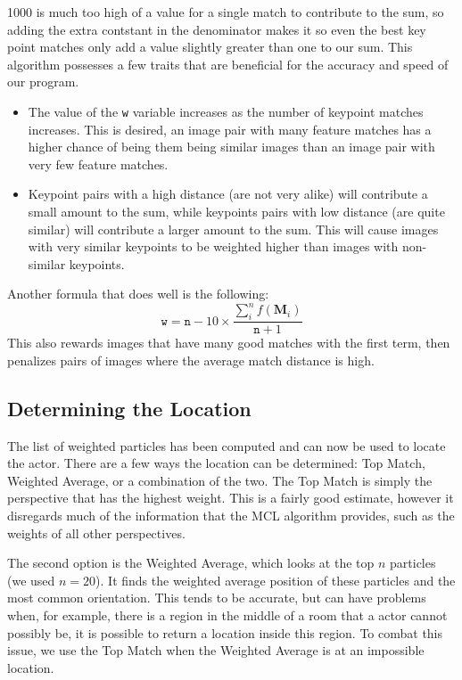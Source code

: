 \documentclass[a4paper,11pt]{article}
\begin{document}
1000 is much too high of a value for a single match to contribute to the sum, so adding the extra contstant in the denominator makes it so even the best key point matches only add a value slightly greater than one to our sum. This algorithm possesses a few traits that are beneficial for the accuracy and speed of our program.
\begin{itemize}
  \item The value of the \texttt{w} variable increases as the number of keypoint matches increases. This is desired, an image pair with many feature matches has a higher chance of being them being similar images than an image pair with very few  feature matches.
  \item Keypoint pairs with a high distance (are not very alike) will contribute a small amount to the sum, while keypoints pairs with low distance (are quite similar) will contribute a larger amount to the sum. This will cause images with very similar keypoints to be weighted higher than images with non-similar keypoints.
\end{itemize}

Another formula that does well is the following:
\[
\mathtt{w} = \mathtt{n} - 10 \times \frac{\sum_{i}^{n} f(\boldsymbol{M}_i)}{\mathtt{n} + 1}
\]
This also rewards images that have many good matches with the first term, then penalizes pairs of images where the average match distance is high.

\subsection{Determining the Location}
The list of weighted particles has been computed and can now be used to locate the actor. There are a few ways the location can be determined: Top Match, Weighted Average, or a combination of the two. The Top Match is simply the perspective that has the highest weight. This is a fairly good estimate, however it disregards much of the information that the MCL algorithm provides, such as the weights of all other perspectives. 

The second option is the Weighted Average, which looks at the top $n$ particles (we used $n=20$). It finds the weighted average position of these particles and the most common orientation. This tends to be accurate, but can have problems when, for example, there is a region in the middle of a room that a actor cannot possibly be, it is possible to return a location inside this region. To combat this issue, we use the Top Match when the Weighted Average is at an impossible location.
\end{document}

